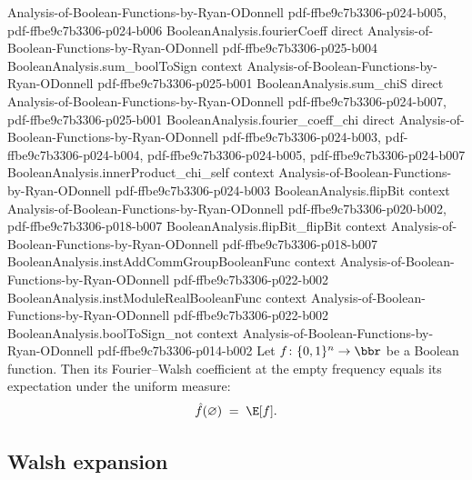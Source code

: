 \begin{lemma}
  {Analysis-of-Boolean-Functions-by-Ryan-ODonnell}
  {pdf-ffbe9c7b3306-p024-b005,
    pdf-ffbe9c7b3306-p024-b006}
\proofstep
  {BooleanAnalysis.fourierCoeff}
  {direct}
  {Analysis-of-Boolean-Functions-by-Ryan-ODonnell}
  {pdf-ffbe9c7b3306-p025-b004}
\proofstep
  {BooleanAnalysis.sum_boolToSign}
  {context}
  {Analysis-of-Boolean-Functions-by-Ryan-ODonnell}
  {pdf-ffbe9c7b3306-p025-b001}
\proofstep
  {BooleanAnalysis.sum_chiS}
  {direct}
  {Analysis-of-Boolean-Functions-by-Ryan-ODonnell}
  {pdf-ffbe9c7b3306-p024-b007,
    pdf-ffbe9c7b3306-p025-b001}
\proofstep
  {BooleanAnalysis.fourier_coeff_chi}
  {direct}
  {Analysis-of-Boolean-Functions-by-Ryan-ODonnell}
  {pdf-ffbe9c7b3306-p024-b003,
    pdf-ffbe9c7b3306-p024-b004,
    pdf-ffbe9c7b3306-p024-b005,
    pdf-ffbe9c7b3306-p024-b007}
\proofstep
  {BooleanAnalysis.innerProduct_chi_self}
  {context}
  {Analysis-of-Boolean-Functions-by-Ryan-ODonnell}
  {pdf-ffbe9c7b3306-p024-b003}
\proofstep
  {BooleanAnalysis.flipBit}
  {context}
  {Analysis-of-Boolean-Functions-by-Ryan-ODonnell}
  {pdf-ffbe9c7b3306-p020-b002,
    pdf-ffbe9c7b3306-p018-b007}
\proofstep
  {BooleanAnalysis.flipBit_flipBit}
  {context}
  {Analysis-of-Boolean-Functions-by-Ryan-ODonnell}
  {pdf-ffbe9c7b3306-p018-b007}
\proofstep
  {BooleanAnalysis.instAddCommGroupBooleanFunc}
  {context}
  {Analysis-of-Boolean-Functions-by-Ryan-ODonnell}
  {pdf-ffbe9c7b3306-p022-b002}
\proofstep
  {BooleanAnalysis.instModuleRealBooleanFunc}
  {context}
  {Analysis-of-Boolean-Functions-by-Ryan-ODonnell}
  {pdf-ffbe9c7b3306-p022-b002}
\proofstep
  {BooleanAnalysis.boolToSign_not}
  {context}
  {Analysis-of-Boolean-Functions-by-Ryan-ODonnell}
  {pdf-ffbe9c7b3306-p014-b002}
Let $f\colon\{0,1\}^n\to\bbr$ be a Boolean function. Then its Fourier–Walsh coefficient
at the empty frequency equals its expectation under the uniform measure:
\[
  \hat f(\varnothing) \;=\; \E[f].
\]
\end{lemma}

\subsection{Walsh expansion}

